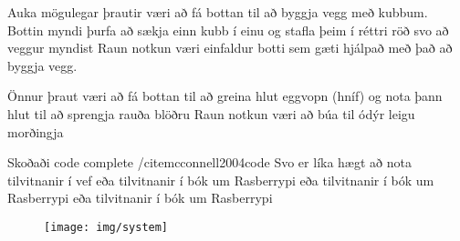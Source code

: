 Auka mögulegar þrautir væri að fá bottan til að byggja vegg með kubbum. Bottin myndi þurfa að sækja einn kubb í einu og stafla þeim 
í réttri röð svo að veggur myndist
Raun notkun væri einfaldur botti sem gæti hjálpað með það að byggja vegg.

Önnur þraut væri að fá bottan til að greina hlut eggvopn (hníf) og nota þann hlut til að sprengja rauða blöðru
Raun notkun væri að búa til ódýr leigu morðingja


Skoðaði code complete /cite{mcconnell2004code}
Svo er líka hægt að nota tilvitnanir í vef \cite{WinNT}
eða tilvitnanir í bók um Rasberrypi \cite{brock2013changing}
eða tilvitnanir í bók um Rasberrypi \cite{test}
eða tilvitnanir í bók um Rasberrypi \cite{test2}
\begin{figure}[h]
\texttt{[image: img/system]}
\end{figure}
